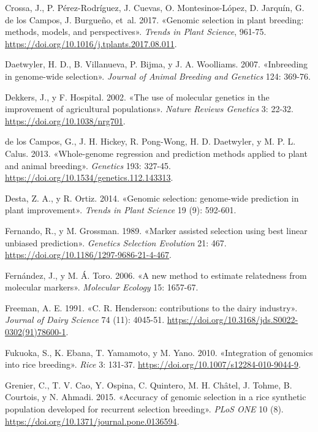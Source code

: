 \documentclass[11pt,spanish,a4paper,oneside,]{book} %
\begin{document}
\leavevmode\hypertarget{ref-cite:37}{}%
Crossa, J., P. Pérez-Rodríguez, J. Cuevas, O. Montesinos-López, D. Jarquín, G. de los Campos, J. Burgueño, et~al. 2017. «Genomic selection in plant breeding: methods, models, and perspectives». \emph{Trends in Plant Science}, 961-75. \url{https://doi.org/10.1016/j.tplants.2017.08.011}.

\leavevmode\hypertarget{ref-cite:40}{}%
Daetwyler, H. D., B. Villanueva, P. Bijma, y J. A. Woolliams. 2007. «Inbreeding in genome-wide selection». \emph{Journal of Animal Breeding and Genetics} 124: 369-76.

\leavevmode\hypertarget{ref-cite:59}{}%
Dekkers, J., y F. Hospital. 2002. «The use of molecular genetics in the improvement of agricultural populations». \emph{Nature Reviews Genetics} 3: 22-32. \url{https://doi.org/10.1038/nrg701}.

\leavevmode\hypertarget{ref-cite:31}{}%
de los Campos, G., J. H. Hickey, R. Pong-Wong, H. D. Daetwyler, y M. P. L. Calus. 2013. «Whole-genome regression and prediction methods applied to plant and animal breeding». \emph{Genetics} 193: 327-45. \url{https://doi.org/10.1534/genetics.112.143313}.

\leavevmode\hypertarget{ref-cite:10}{}%
Desta, Z. A., y R. Ortiz. 2014. «Genomic selection: genome-wide prediction in plant improvement». \emph{Trends in Plant Science} 19 (9): 592-601.

\leavevmode\hypertarget{ref-cite:73}{}%
Fernando, R., y M. Grossman. 1989. «Marker assisted selection using best linear unbiased prediction». \emph{Genetics Selection Evolution} 21: 467. \url{https://doi.org/10.1186/1297-9686-21-4-467}.

\leavevmode\hypertarget{ref-cite:24}{}%
Fernández, J., y M. Á. Toro. 2006. «A new method to estimate relatedness from molecular markers». \emph{Molecular Ecology} 15: 1657-67.

\leavevmode\hypertarget{ref-cite:28}{}%
Freeman, A. E. 1991. «C. R. Henderson: contributions to the dairy industry». \emph{Journal of Dairy Science} 74 (11): 4045-51. \url{https://doi.org/10.3168/jds.S0022-0302(91)78600-1}.

\leavevmode\hypertarget{ref-cite:61}{}%
Fukuoka, S., K. Ebana, T. Yamamoto, y M. Yano. 2010. «Integration of genomics into rice breeding». \emph{Rice} 3: 131-37. \url{https://doi.org/10.1007/s12284-010-9044-9}.

\leavevmode\hypertarget{ref-cite:65}{}%
Grenier, C., T. V. Cao, Y. Ospina, C. Quintero, M. H. Châtel, J. Tohme, B. Courtois, y N. Ahmadi. 2015. «Accuracy of genomic selection in a rice synthetic population developed for recurrent selection breeding». \emph{PLoS ONE} 10 (8). \url{https://doi.org/10.1371/journal.pone.0136594}.
\end{document}
